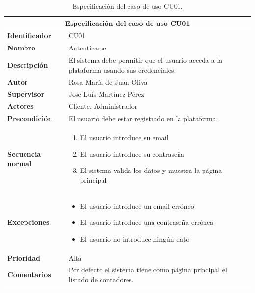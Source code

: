 \documentclass[pdftex,11pt,a4paper]{book}
\begin{document}
\begin{center}
\begin{longtable}{|m{}|m{11cm}|}
\hline
\multicolumn{2}{|c|}{\textbf{Especificación del caso de uso CU01}}\\
\hline 
\endhead

\textbf{Identificador} & CU01  
\\ \hline
\textbf{Nombre} & Autenticarse  
\\ \hline
\textbf{Descripción} & El sistema debe permitir que el usuario acceda a la plataforma usando sus credenciales.  
\\ \hline
\textbf{Autor} & Rosa María de Juan Oliva 
\\ \hline
\textbf{Supervisor} & Jose Luís Martínez Pérez  
\\ \hline
\textbf{Actores} & Cliente, Administrador 
\\ \hline
\textbf{Precondición} & El usuario debe estar registrado en la plataforma. 
\\ \hline
\textbf{Secuencia normal} & 
\begin{enumerate}
\addtolength{\itemsep}{-3mm}
\item El usuario introduce su email
\item El usuario introduce su contraseña
\item El sistema valida los datos y muestra la página principal
\end{enumerate}
\\ \hline
\textbf{Excepciones} &
\begin{itemize}
\addtolength{\itemsep}{-3mm}
\item El usuario introduce un email erróneo
\item El usuario introduce una contraseña errónea
\item El usuario no introduce ningún dato
\end{itemize}
\\ \hline
\textbf{Prioridad} & Alta  
\\ \hline
\textbf{Comentarios} & Por defecto el sistema tiene como página principal el listado de contadores.  
\\ \hline

\caption{Especificación del caso de uso CU01.} \label{tablalarga:tablaCU01}
\end{longtable}
\end{center}



\renewcommand{\tablename}{Tabla}
\renewcommand{\arraystretch}{1,7}
\end{document}
